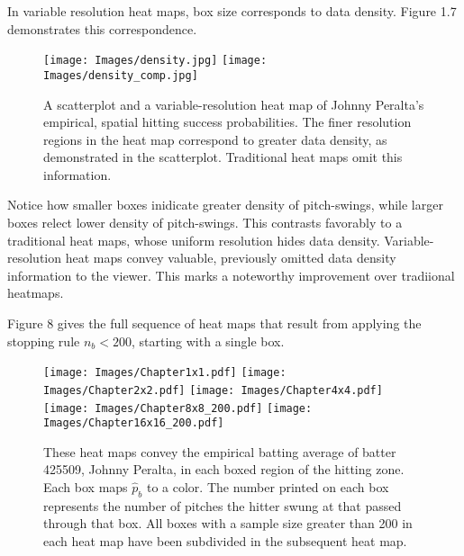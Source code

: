 In variable resolution heat maps, box size corresponds to data density. Figure 1.7 demonstrates this correspondence. 
        \begin{figure}[H]
      	\centering
      	\texttt{[image: Images/density.jpg]}
      	\texttt{[image: Images/density\_comp.jpg]} 
      	\caption{A scatterplot and a variable-resolution heat map of Johnny Peralta's empirical, spatial hitting success probabilities. The finer resolution regions in the heat map correspond to greater data density, as demonstrated in the scatterplot. Traditional heat maps omit this information.}
      	\end{figure}
Notice how smaller boxes inidicate greater density of pitch-swings, while larger boxes relect lower density of pitch-swings. This contrasts favorably to a traditional heat maps, whose uniform resolution hides data density. Variable-resolution heat maps convey valuable, previously omitted data density information to the viewer. This marks a noteworthy improvement over tradiional heatmaps.

Figure 8 gives the full sequence of heat maps that result from applying the stopping rule $n_{b} < 200$, starting with a single box.
        \begin{figure}[H]
      	\centering
      	\texttt{[image: Images/Chapter1x1.pdf]}
      	\texttt{[image: Images/Chapter2x2.pdf]}
      	\texttt{[image: Images/Chapter4x4.pdf]}
      	\texttt{[image: Images/Chapter8x8\_200.pdf]} 
      	\texttt{[image: Images/Chapter16x16\_200.pdf]} 
      	\caption{These heat maps convey the empirical batting average of batter 425509, Johnny Peralta, in each boxed region of the hitting zone. Each box maps $\hat{p}_{b}$ to a color. The number printed on each box represents the number of pitches the hitter swung at that passed through that box. All boxes with a sample size greater than 200 in each heat map have been subdivided in the subsequent heat map.}
      	\end{figure}
      	
